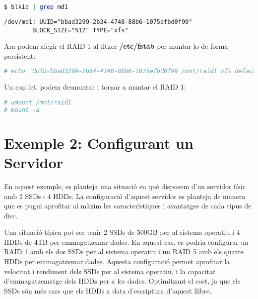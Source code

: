 \begin{lstlisting}[language=bash, numbers=none]
$ blkid | grep md1
\end{lstlisting}

\begin{terminaloutput}
\footnotesize\begin{verbatim}
/dev/md1: UUID="bbad3299-2b34-4748-88b6-1075efbd0f99" 
        BLOCK_SIZE="512" TYPE="xfs"
\end{verbatim}
\end{terminaloutput}

Ara podem afegir el RAID 1 al fitxer \textbf{/etc/fstab} per muntar-lo de forma persistent:

\begin{lstlisting}[language=bash, numbers=none, commentstyle=\color{black}]
# echo "UUID=bbad3299-2b34-4748-88b6-1075efbd0f99 /mnt/raid1 xfs defaults 0 1" >> /etc/fstab
\end{lstlisting}

Un cop fet, podem desmuntar i tornar a muntar el RAID 1:

\begin{lstlisting}[language=bash, numbers=none, commentstyle=\color{black}]
# umount /mnt/raid1
# mount -a
\end{lstlisting}


\section{Exemple 2: Configurant un Servidor}\label{exemple-2-configurant-un-servidor}

En aquest exemple, es planteja una situació en què disposem d'un servidor físic amb 2 SSDs i 4 HDDs. La configuració d'aquest servidor es planteja de manera que es pugui aprofitar al màxim les característiques i avantatges de cada tipus de disc. 

\begin{mdframed}[linewidth=2pt,linecolor=teal]
Una situació típica pot ser tenir 2 SSDs de 500GB per al sistema operatiu i 4 HDDs de 4TB per emmagatzemar dades. En aquest cas, es podria configurar un RAID 1 amb els dos SSDs per al sistema operatiu i un RAID 5 amb els quatre HDDs per emmagatzemar dades. Aquesta configuració permet aprofitar la velocitat i rendiment dels SSDs per al sistema operatiu, i la capacitat d'emmagatzematge dels HDDs per a les dades. Optimitzant el cost, ja que els SSDs són més cars que els HDDs a data d'escriptura d'aquest llibre.
\end{mdframed}

